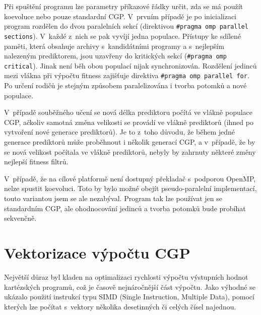 Při spuštění programu lze parametry příkazové řádky určit, zda se má použít koevoluce nebo pouze standardní CGP. V~prvním případě je po inicializaci program rozdělen do dvou paralelních sekcí (direktivou \texttt{\#pragma omp parallel sections}). V~každé z~nich se pak vyvíjí jedna populace. Přístupy ke sdílené paměti, která obsahuje archivy s~kandidátními programy a s~nejlepším nalezeným prediktorem, jsou uzavřeny do kritických sekcí (\texttt{\#pragma omp critical}). Jinak není běh obou populací nijak synchronizován. Rozdělení jedinců mezi vlákna při výpočtu fitness zajišťuje direktiva \texttt{\#pragma omp parallel for}. Po určení rodičů je stejným způsobem paralelizována i tvorba potomků a nové populace.

V~případě souběžného učení se nová délka prediktoru počítá ve vlákně populace CGP, ačkoliv samotná změna velikosti se provádí ve vlákně prediktorů (ihned po vytvoření nové generace prediktorů). Je to z~toho důvodu, že během jedné generace prediktorů může proběhnout i několik generací CGP, a v~případě, že by se nová velikost počítala ve vlákně prediktorů, nebyly by zahrnuty některé změny nejlepší fitness filtrů.

V~případě, že na cílové platformě není dostupný překladač s~podporou OpenMP, nelze spustit koevoluci. Toto by bylo možné obejít pseudo-paralelní implementací, touto variantou jsem se ale nezabýval. Program tak lze používat jen se standardním CGP, ale ohodnocování jedinců a tvorba potomků bude probíhat sekvenčně.


\section{Vektorizace výpočtu CGP}
\label{secImplVectorization}

Největší důraz byl kladen na optimalizaci rychlosti výpočtu výstupních hodnot kartézských programů, což je časově nejnáročnější část výpočtu. Jako výhodné se ukázalo použití  instrukcí typu SIMD (Single Instruction, Multiple Data), pomocí kterých lze počítat s~vektory několika desetinných či celých čísel najednou.


